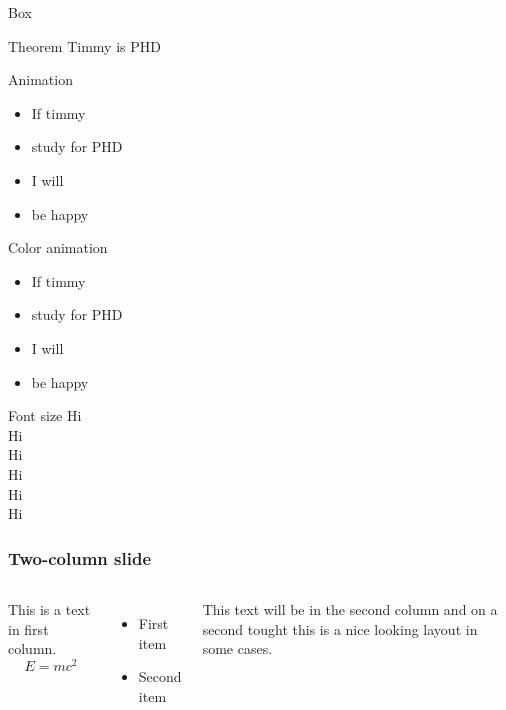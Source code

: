 \begin{frame}{Box}
\begin{beamerboxesrounded}[scheme=alera,shadow=true]{Theorem}
Timmy is PHD
\end{beamerboxesrounded}
\end{frame}

\begin{frame}{Animation}
\begin{itemize}
\item If timmy \pause
\item study for PHD \pause
\item I will \pause
\item be happy
\end{itemize}
\end{frame}

\begin{frame}{Color animation}
\begin{itemize}
 \item If timmy \pause
{} \item study for PHD \pause
{} \item I will \pause
{} \item be happy
\end{itemize}
\end{frame}

\begin{frame}{Font size}
Hi \\
\tiny{Hi} \\
\large{Hi} \\
\Large{Hi} \\
\huge{Hi} \\
\Huge{Hi} 
\end{frame}

\begin{frame}
\frametitle{Two-column slide}
 
\begin{columns}
 
This is a text in first column.
$$E=mc^2$$
\begin{itemize}
\item First item
\item Second item
\end{itemize}
 
This text will be in the second column
and on a second tought this is a nice looking
layout in some cases.
\end{columns}
\end{frame}
